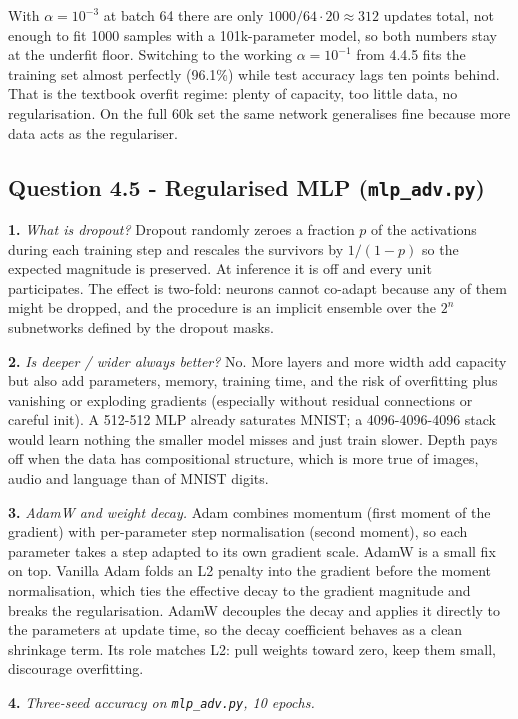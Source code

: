 \documentclass[11pt,a4paper]{article}
\newcommand{\Q}[1]{\subsection*{Question #1}}
\newcommand{\Qpart}[1]{\textbf{#1.}}
\begin{document}
With $\alpha = 10^{-3}$ at batch 64 there are only $1000 / 64 \cdot 20 \approx 312$ updates total, not enough to fit 1000 samples with a 101k-parameter model, so both numbers stay at the underfit floor. Switching to the working $\alpha = 10^{-1}$ from 4.4.5 fits the training set almost perfectly (96.1\%) while test accuracy lags ten points behind. That is the textbook overfit regime: plenty of capacity, too little data, no regularisation. On the full 60k set the same network generalises fine because more data acts as the regulariser.

\Q{4.5 - Regularised MLP (\texttt{mlp\_adv.py})}

\Qpart{1} \textit{What is dropout?} Dropout randomly zeroes a fraction $p$ of the activations during each training step and rescales the survivors by $1/(1-p)$ so the expected magnitude is preserved. At inference it is off and every unit participates. The effect is two-fold: neurons cannot co-adapt because any of them might be dropped, and the procedure is an implicit ensemble over the $2^n$ subnetworks defined by the dropout masks.

\Qpart{2} \textit{Is deeper / wider always better?} No. More layers and more width add capacity but also add parameters, memory, training time, and the risk of overfitting plus vanishing or exploding gradients (especially without residual connections or careful init). A 512-512 MLP already saturates MNIST; a 4096-4096-4096 stack would learn nothing the smaller model misses and just train slower. Depth pays off when the data has compositional structure, which is more true of images, audio and language than of MNIST digits.

\Qpart{3} \textit{AdamW and weight decay.} Adam combines momentum (first moment of the gradient) with per-parameter step normalisation (second moment), so each parameter takes a step adapted to its own gradient scale. AdamW is a small fix on top. Vanilla Adam folds an L2 penalty into the gradient before the moment normalisation, which ties the effective decay to the gradient magnitude and breaks the regularisation. AdamW decouples the decay and applies it directly to the parameters at update time, so the decay coefficient behaves as a clean shrinkage term. Its role matches L2: pull weights toward zero, keep them small, discourage overfitting.

\Qpart{4} \textit{Three-seed accuracy on \texttt{mlp\_adv.py}, 10 epochs.}
\end{document}
